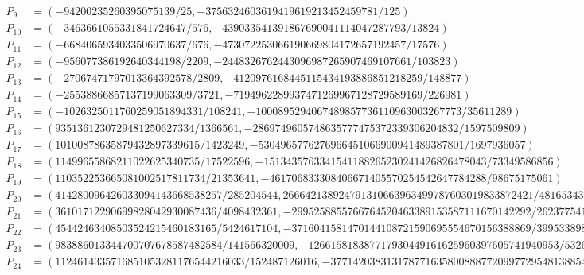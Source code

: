 \documentclass[11pt]{report}
\begin{document}
\begin{theorem}
{\begin{align*}
    P_9    & = (-94200235260395075139/25, -3756324603619419619213452459781/125)                                                                \\
    P_{10} & = (-3463661055331841724647/576, -439033541391867690041114047287793/13824)                                                         \\
    P_{11} & = (-6684065934033506970637/676, -473072253066190669804172657192457/17576)                                                         \\
    P_{12} & = (-956077386192640344198/2209,     -2448326762443096987265907469107661/103823)                                                   \\
    P_{13} & = (-27067471797013364392578/2809,    -4120976168445115434193886851218259/148877)                                                  \\
    P_{14} & = (-25538866857137199063309/3721,     -7194962289937471269967128729589169/226981)                                                 \\
    P_{15} & = (-1026325011760259051894331/108241,        -1000895294067489857736110963003267773/35611289)                                     \\
    P_{16} & = (9351361230729481250627334/1366561,        -2869749605748635777475372339306204832/1597509809)                                   \\
    P_{17} & = (10100878635879432897339615/1423249,        -5304965776276966451066900941489387801/1697936057)                                  \\
    P_{18} & = (11499655868211022625340735/17522596,        -1513435763341541188265230241426826478043/73349586856)                             \\
    P_{19} & = (110352253665081002517811734/21353641,        -461706833308406671405570254542647784288/98675175061)                             \\
    P_{20} & = (414280096426033094143668538257/285204544,        266642138924791310663963499787603019833872421/4816534339072)                  \\
    P_{21} & = (36101712290699828042930087436/4098432361,        -2995258855766764520463389153587111670142292/262377541318859)                 \\
    P_{22} & = (45442463408503524215460183165/5424617104,        -3716041581470144108721590695554670156388869/399533898943808)                 \\
    P_{23} & = (983886013344700707678587482584/141566320009,        -126615818387717930449161625960397605741940953/53264752602346277)          \\
    P_{24} & = (1124614335716851053281176544216033/152487126016,        -37714203831317877163580088877209977295481388540127/59545612760743936) \\
  \end{align*}
  }
\end{theorem}
\end{document}
